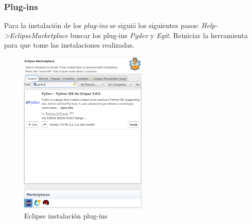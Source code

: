 \subsubsection*{Plug-ins}
Para la instalación de los \textit{plug-ins} se siguió los siguientes pasos: \textit{Help->EclipseMarketplace} buscar los plug-ins \textit{Pydev} y 
\textit{Egit}. Reiniciar la herramienta para que tome las instalaciones realizadas.
\begin{figure}[h]
 \centering
  \includegraphics[height=8cm,keepaspectratio=true,clip=true]{imagenes/Apendice/eclipse5.png}
  \caption{Eclipse instalación plug-ins}
\end{figure}


